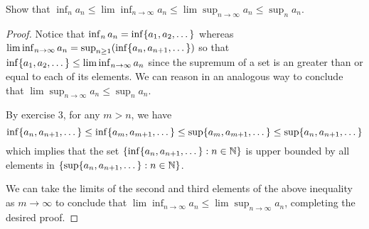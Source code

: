 \begin{exercise}{22}
Show that $\inf_na_n\leq \lim\inf_{n\to\infty}a_n\leq \lim\sup_{n\to\infty}a_n\leq \sup_na_n$.
\end{exercise}
\begin{proof}
Notice that $\inf_na_n = \inf\{a_1,a_2,\dots\}$ whereas \\
$\lim\inf_{n\to\infty}a_n=\sup_{n\geq 1}(\inf\{a_n,a_{n+1},\dots\})$ so that
\\
$\inf\{a_1,a_2,\dots\}\leq\lim\inf_{n\to\infty}a_n$ since the supremum of a set is an greater than or equal to each of its elements. We can reason in an analogous way to conclude that $\lim\sup_{n\to\infty}a_n\leq \sup_na_n$. 

By exercise 3, for any $m>n$, we have 
\[
\inf\{a_n,a_{n+1},\dots\}
\leq\inf\{a_m,a_{m+1},\dots\} \leq\sup\{a_m,a_{m+1},\dots\} \leq\sup\{a_n,a_{n+1},\dots\}
\]
which implies that the set $\{\inf\{a_n,a_{n+1},\dots\}:n\in\mathbb{N}\}$ is upper bounded by all elements in $\{\sup\{a_n,a_{n+1},\dots\}:n\in\mathbb{N}\}$.

We can take the limits of the second and third elements of the above inequality as $m\to\infty$ to conclude that $\lim\inf_{n\to\infty}a_n\leq\lim\sup_{n\to\infty}a_n$, completing the desired proof.



\end{proof}

